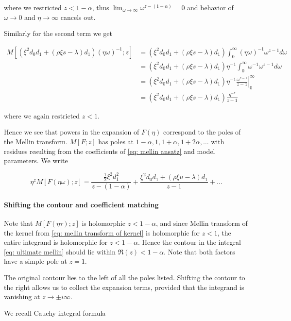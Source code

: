 \documentclass[12pt]{article}
\theoremstyle{plain}
\begin{document}
where we restricted $z<1-\alpha$, thus $\lim _{\omega \rightarrow \infty} \omega ^{z-(1-\alpha)} = 0$ and behavior of $\omega\rightarrow 0$ and $\eta \rightarrow \infty$ cancels out.

Similarly for the second term we get

$$
\begin{aligned}
M\left[(\xi^2 d_0d_1 + (\rho\xi s - \lambda) d_1) (\eta\omega)^{-1}; z\right] &= (\xi^2 d_0d_1 + (\rho\xi s - \lambda) d_1) \int _0 ^\infty (\eta\omega)^{-1} \omega ^{z-1} d\omega \\
&= (\xi^2 d_0d_1 + (\rho\xi s - \lambda) d_1) \eta ^{-1}\int _0 ^\infty \omega ^ {-1} \omega ^{z-1} d\omega \\
&= (\xi^2 d_0d_1 + (\rho\xi s - \lambda) d_1) \eta ^{-1} \left. \frac{\omega^{z-1}}{z-1} \right|^\infty _0 \\
&= (\xi^2 d_0d_1 + (\rho\xi s - \lambda) d_1) \frac{\eta ^{-z}}{z-1}
\end{aligned}
$$

where we again restricted $z<1$.

Hence we see that powers in the expansion of $F(\eta)$ correspond to the poles of the Mellin transform. $M[F; z]$ has poles at $1-\alpha, 1, 1+\alpha, 1+2\alpha, \dots$ with residues resulting from the coefficients of \eqref{eq: mellin ansatz} and model parameters. We write

$$
\eta^z M[F(\eta\omega); z] = \frac{\frac 12 \xi^2 d_1^2}{z - (1-\alpha)} + \frac{\xi^2 d_0d_1 + (\rho\xi u - \lambda) d_1}{z - 1} + \dots
$$

\paragraph{Shifting the contour and coefficient matching}

Note that $M[F(\eta\tau);z]$ is holomorphic $z<1-\alpha$, and since Mellin transform of the kernel from \eqref{eq: mellin transform of kernel} is holomorphic for $z<1$, the entire integrand is holomorphic for $z < 1-\alpha$. Hence the contour in the integral \eqref{eq: ultimate mellin} should lie within $\Re (z) < 1 - \alpha$. Note that both factors have a simple pole at $z=1$.

The original contour lies to the left of all the poles listed. Shifting the contour to the right allows us to collect the expansion terms, provided that the integrand is vanishing at $z \rightarrow \pm i\infty$.

We recall Cauchy integral formula
\end{document}
